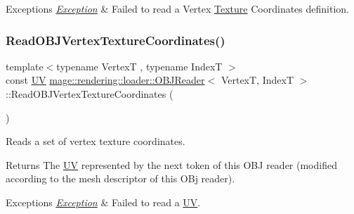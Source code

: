 \begin{DoxyExceptions}{Exceptions}
{\em \mbox{\hyperlink{classmage_1_1_exception}{Exception}}} & Failed to read a Vertex \mbox{\hyperlink{classmage_1_1rendering_1_1_texture}{Texture}} Coordinates definition. \\
\hline
\end{DoxyExceptions}
\mbox{\label{classmage_1_1rendering_1_1loader_1_1_o_b_j_reader_a3fdbcdecf40525631afc53ce6a6dba45}} 
\subsubsection{\texorpdfstring{Read\+O\+B\+J\+Vertex\+Texture\+Coordinates()}{ReadOBJVertexTextureCoordinates()}}
{\footnotesize\ttfamily template$<$typename VertexT , typename IndexT $>$ \\
const \mbox{\hyperlink{structmage_1_1_u_v}{UV}} \mbox{\hyperlink{classmage_1_1rendering_1_1loader_1_1_o_b_j_reader}{mage\+::rendering\+::loader\+::\+O\+B\+J\+Reader}}$<$ VertexT, IndexT $>$\+::Read\+O\+B\+J\+Vertex\+Texture\+Coordinates (\begin{DoxyParamCaption}{ }\end{DoxyParamCaption})\hspace{0.3cm}{\ttfamily [private]}}

Reads a set of vertex texture coordinates.

\begin{DoxyReturn}{Returns}
The {\ttfamily \mbox{\hyperlink{structmage_1_1_u_v}{UV}}} represented by the next token of this O\+BJ reader (modified according to the mesh descriptor of this O\+Bj reader). 
\end{DoxyReturn}

\begin{DoxyExceptions}{Exceptions}
{\em \mbox{\hyperlink{classmage_1_1_exception}{Exception}}} & Failed to read a {\ttfamily \mbox{\hyperlink{structmage_1_1_u_v}{UV}}}. \\
\hline
\end{DoxyExceptions}


